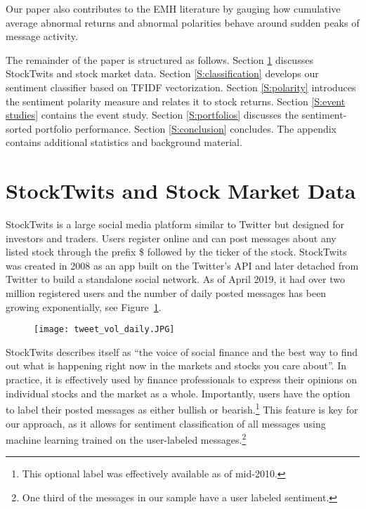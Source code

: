 Our paper also contributes to the EMH literature by gauging how cumulative average abnormal returns and abnormal polarities behave around sudden peaks of message activity. 



The remainder of the paper is structured as follows. Section \ref{S:data} discusses StockTwits and stock market data. Section \ref{S:classification} develops our sentiment classifier based on TFIDF vectorization. Section \ref{S:polarity} introduces the sentiment polarity measure and relates it to stock returns. Section \ref{S:event studies} contains the event study. Section \ref{S:portfolios} discusses the sentiment-sorted portfolio performance. Section \ref{S:conclusion} concludes. The appendix contains additional statistics and background material.


\section{StockTwits and Stock Market Data}
\label{S:data}

StockTwits is a large social media platform similar to Twitter but designed for investors and traders. Users register online and can post messages about any listed stock through the prefix \$ followed by the ticker of the stock. StockTwits was created in 2008 as an app built on the Twitter's API and later detached from Twitter to build a standalone social network. As of April 2019, it had over two million registered users and the number of daily posted messages has been growing exponentially, see Figure~\ref{fig:tweet_vol_daily}. 

\clearpage 

\begin{figure}[h]
    \centering
    \texttt{[image: tweet\_vol\_daily.JPG]}
    \label{fig:tweet_vol_daily}
\end{figure}


StockTwits describes itself as ``the voice of social finance and the best way to find out what is happening right now in the markets and stocks you care about''. In practice, it is effectively used by finance professionals to express their opinions on individual stocks and the market as a whole. Importantly, users have the option to label their posted messages as either bullish or bearish.\footnote{This optional label was effectively available as of mid-2010.} This feature is key for our approach, as it allows for sentiment classification of all messages using machine learning trained on the user-labeled messages.\footnote{One third of the messages in our sample have a user labeled sentiment.} 

